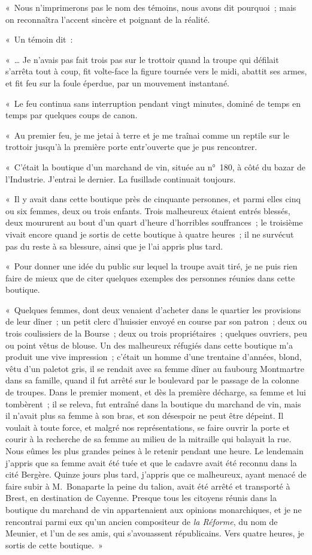 \documentclass[french,twoside]{book} %
\begin{document}
\noindent « Nous n’imprimerons pas le nom des témoins, nous avons dit pourquoi ; mais on reconnaîtra l’accent sincère et poignant de la réalité.\par
« Un témoin dit :\par
« … Je n’avais pas fait trois pas sur le trottoir quand la troupe qui défilait s’arrêta tout à coup, fit volte-face la figure tournée vers le midi, abattit ses armes, et fit feu sur la foule éperdue, par un mouvement instantané.\par
« Le feu continua sans interruption pendant vingt minutes, dominé de temps en temps par quelques coups de canon.\par
« Au premier feu, je me jetai à terre et je me traînai comme un reptile sur le trottoir jusqu’à la première porte entr’ouverte que je pus rencontrer.\par
« C’était la boutique d’un marchand de vin, située au n° 180, à côté du bazar de l’Industrie. J’entrai le dernier. La fusillade continuait toujours.\par
« Il y avait dans cette boutique près de cinquante personnes, et parmi elles cinq ou six femmes, deux ou trois enfants. Trois malheureux étaient entrés blessés, deux moururent au bout d’un quart d’heure d’horribles souffrances ; le troisième vivait encore quand je sortis de cette boutique à quatre heures ; il ne survécut pas du reste à sa blessure, ainsi que je l’ai appris plus tard.\par
« Pour donner une idée du public sur lequel la troupe avait tiré, je ne puis rien faire de mieux que de citer quelques exemples des personnes réunies dans cette boutique.\par
« Quelques femmes, dont deux venaient d’acheter dans le quartier les provisions de leur dîner ; un petit clerc d’huissier envoyé en course par son patron ; deux ou trois coulissiers de la Bourse ; deux ou trois propriétaires ; quelques ouvriers, peu ou point vêtus de blouse. Un des malheureux réfugiés dans cette boutique m’a produit une vive impression ; c’était un homme d’une trentaine d’années, blond, vêtu d’un paletot gris, il se rendait avec sa femme dîner au faubourg Montmartre dans sa famille, quand il fut arrêté sur le boulevard par le passage de la colonne de troupes. Dans le premier moment, et dès la première décharge, sa femme et lui tombèrent ; il se releva, fut entraîné dans la boutique du marchand de vin, mais il n’avait plus sa femme à son bras, et son désespoir ne peut être dépeint. Il voulait à toute force, et malgré nos représentations, se faire ouvrir la porte et courir à la recherche de sa femme au milieu de la mitraille qui balayait la rue. Nous eûmes les plus grandes peines à le retenir pendant une heure. Le lendemain j’appris que sa femme avait été tuée et que le cadavre avait été reconnu dans la cité Bergère. Quinze jours plus tard, j’appris que ce malheureux, ayant menacé de faire subir à M. Bonaparte la peine du talion, avait été arrêté et transporté à Brest, en destination de Cayenne. Presque tous les citoyens réunis dans la boutique du marchand de vin appartenaient aux opinions monarchiques, et je ne rencontrai parmi eux qu’un ancien compositeur de \emph{la Réforme}, du nom de Meunier, et l’un de ses amis, qui s’avouassent républicains. Vers quatre heures, je sortis de cette boutique. »\par
\end{document}

